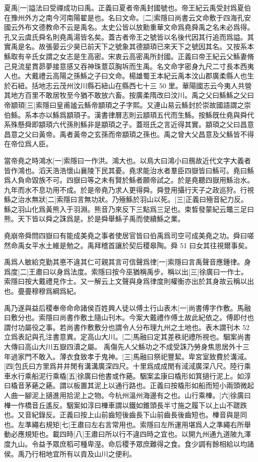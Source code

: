 夏禹[一]謚法曰受禪成功曰禹。正義曰夏者帝禹封國號也。帝王紀云禹受封爲夏伯在豫州外方之南今河南陽翟是也。名曰文命。[二]索隱曰尚書云文命敷于四海孔安國云外布文德教命不云是禹名。太史公皆以放勳重華文命爲堯舜禹之名未必爲得。孔又云虞氏舜名則堯禹湯皆名矣。蓋古者帝王之號皆以名後代因其行追而爲謚。其實禹是名。故張晏云少昊已前天下之號象其德顓頊已來天下之號因其名。又按系本鯀取有辛氏女謂之女志是生高密。宋衷云高密禹所封國。正義曰帝王紀云父鯀妻脩己見流星貫昴夢接意感又吞神珠薏苡胸坼而生禹。名文命字密身九尺二寸長本西夷人也。大戴禮云高陽之孫鯀之子曰文命。楊雄蜀王本紀云禹本汶山郡廣柔縣人也生於石紐。括地志云茂州汶川縣石紐山在縣西七十三
50
里。華陽國志云今夷人共營其地方百里不敢居牧至今猶不敢放六畜。按廣柔隋改曰汶川。禹之父曰鯀鯀之父曰帝顓頊[三]索隱曰皇甫謐云鯀帝顓頊之子字熙。又連山易云鯀封於崇故國語謂之崇伯鯀。系本亦以鯀爲顓頊子。漢書律曆志則云顓頊五代而生鯀。按鯀旣仕堯與舜代系殊懸舜即顓頊六代孫則鯀非是顓頊之子。蓋班氏之言近得其實。顓頊之父曰昌意昌意之父曰黃帝。禹者黃帝之玄孫而帝顓頊之孫也。禹之曾大父昌意及父鯀皆不得在帝位爲人臣。

當帝堯之時鴻水[一]索隱曰一作洪。鴻大也。以鳥大曰鴻小曰鴈故近代文字大義者皆作鴻也。滔天浩浩懷山襄陵下民其憂。堯求能治水者羣臣四嶽皆曰鯀可。堯曰鯀爲人負命毀族不可。四嶽曰等之未有賢於鯀者願帝試之。於是堯聽四嶽用鯀治水。九年而水不息功用不成。於是帝堯乃求人更得舜。舜登用攝行天子之政巡狩。行視鯀之治水無狀[二]索隱曰言無功狀。乃殛鯀於羽山以死。[三]正義曰殛音紀力反。鯀之羽山化爲黃熊入于羽淵。熊音乃來反下三點爲三足也。束晳發蒙紀云鼈三足曰熊。天下皆以舜之誅爲是。於是舜舉鯀子禹而使續鯀之業。

堯崩帝舜問四嶽曰有能成美堯之事者使居官皆曰伯禹爲司空可成美堯之功。舜曰嗟然命禹女平水土維是勉之。禹拜稽首讓於契后稷皋陶。舜
51
曰女其往視爾事矣。

禹爲人敏給克勤其悳不違其仁可親其言可信聲爲律[一]索隱曰言禹聲音應鍾律。身爲度[二]王肅曰以身爲法度。索隱曰按今巫猶稱禹步。稱以出[三]徐廣曰一作士。索隱曰按大戴禮見作士。又一解云上文聲與身爲律度則權衡亦出於其身故云稱以出也。亹亹穆穆爲綱爲紀。

禹乃遂與益后稷奉帝命命諸侯百姓興人徒以傅土行山表木[一]尚書傅字作敷。馬融曰敷分也。索隱曰尚書作敷土隨山刊木。今案大戴禮作傅土故此紀依之。傅即付也謂付功屬役之事。若尚書作敷敷分也謂令人分布理九州之土地也。表木謂刊木
52
立爲表記與孔注書意異。定高山大川。[二]馬融曰定其差秩祀禮所視也。駰案尚書大傳曰高山大川五嶽四瀆之屬。 禹傷先人父鯀功之不成受誅乃勞身焦思居外十三年過家門不敢入。薄衣食致孝于鬼神。[三]馬融曰祭祀豐絜。卑宮室致費於溝淢。[四]包氏曰方里爲井井閒有溝溝廣深四尺。十里爲成成閒有淢淢廣深八尺。陸行乘車水行乘船泥行乘橇[五]徐廣曰他書或作蕝。駰案孟康曰橇形如箕擿行泥上。如淳曰橇音茅蕝之蕝。謂以板置其泥上以通行路也。正義曰按橇形如船而短小兩頭微起人曲一腳泥上擿進用拾泥上之物。今杭州溫州海邊有之也。山行乘檋。[六]徐廣曰檋一作橋音丘遙反。駰案如淳曰檋車謂以鐵如錐頭長半寸施之履下以上山不蹉跌也。又音紀錄反。正義曰按上山前齒短後齒長下山前齒長後齒短也。檋音與是同也。左準繩右規矩[七]王肅曰左右言常用也。索隱曰左所運用堪爲人之準繩右所舉動必應規矩也。載四時[八]王肅曰所以行不違四時之宜也。以開九州通九道陂九澤度九山。令益予眾庶稻可種卑溼。命后稷予眾庶難得之食。食少調有餘相給以均諸侯。禹乃行相地宜所有以貢及山川之便利。

